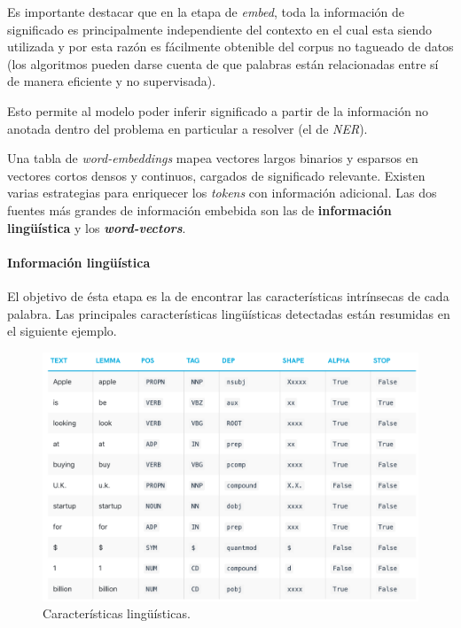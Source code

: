 \documentclass[12pt,a4paper,]{scrartcl}
\let\oldparagraph\paragraph
\renewcommand{\paragraph}[1]{\oldparagraph{#1}\mbox{}}
\begin{document}
Es importante destacar que en la etapa de \emph{embed}, toda la información de significado es principalmente independiente del contexto en el cual esta siendo utilizada y por esta razón es fácilmente obtenible del corpus no tagueado de datos (los algoritmos pueden darse cuenta de que palabras están relacionadas entre sí de manera eficiente y no supervisada).

Esto permite al modelo poder inferir significado a partir de la información no anotada dentro del problema en particular a resolver (el de \emph{NER}).

Una tabla de \emph{word-embeddings} mapea vectores largos binarios y esparsos en vectores cortos densos y continuos, cargados de significado relevante. Existen varias estrategias para enriquecer los \emph{tokens} con información adicional. Las dos fuentes más grandes de información embebida son las de \textbf{información lingüística} y los \textbf{\emph{word-vectors}}.

\hypertarget{informaciuxf3n-linguxfcuxedstica}{%
\paragraph{Información lingüística}\label{informaciuxf3n-linguxfcuxedstica}}

El objetivo de ésta etapa es la de encontrar las características intrínsecas de cada palabra. Las principales características lingüísticas detectadas están resumidas en el siguiente ejemplo.

\begin{figure}[H]

{\centering \includegraphics{assets/pos.pdf} 

}

\caption{Características lingüísticas.}\label{fig:formula-pos}
\end{figure}
\end{document}
